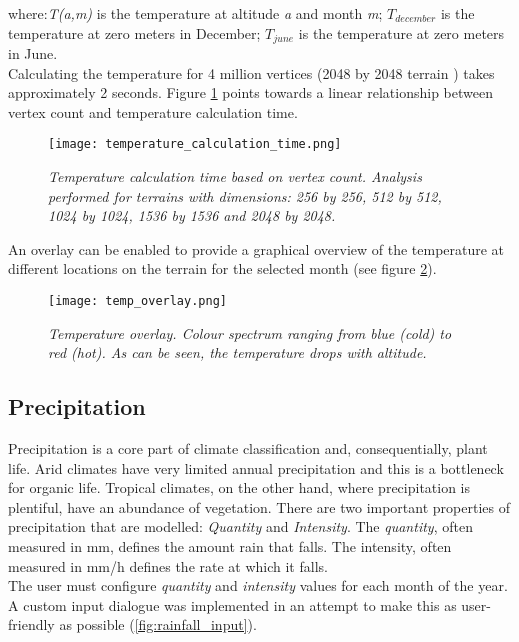 where:\textit{T(a,m)} is the temperature at altitude \textit{a} and month \textit{m}; \textit{$T_{december}$} is the temperature at zero meters in December; \textit{$T_{june}$} is the temperature at zero meters in June.\\

Calculating the temperature for 4 million vertices (2048 by 2048 terrain ) takes approximately 2 seconds. Figure \ref{fig:temperature_calculation_time} points towards a linear relationship between vertex count and temperature calculation time.

\begin{figure}
\center
	\texttt{[image: temperature\_calculation\_time.png]}
	\caption{ \textit{Temperature calculation time based on vertex count. Analysis performed for terrains with dimensions: 256 by 256, 512 by 512, 1024 by 1024, 1536 by 1536 and 2048 by 2048.} }
	\label{fig:temperature_calculation_time}
\end{figure}

An overlay can be enabled to provide a graphical overview of the temperature at different locations on the terrain for the selected month (see figure \ref{fig:temp_overlay}).

\begin{figure}
\center
	\texttt{[image: temp\_overlay.png]}
	\caption{ \textit{Temperature overlay. Colour spectrum ranging from blue (cold) to red (hot). As can be seen, the temperature drops with altitude.}}
	\label{fig:temp_overlay}
\end{figure}

\subsection{Precipitation} \label{sec:precipitation}

Precipitation is a core part of climate classification and, consequentially, plant life. Arid climates have very limited annual precipitation and this is a bottleneck for organic life. Tropical climates, on the other hand, where precipitation is plentiful, have an abundance of vegetation. There are two important properties of precipitation that are modelled: \textit{Quantity} and \textit{Intensity}. The \textit{quantity}, often measured in mm, defines the amount rain that falls. The intensity, often measured in mm/h defines the rate at which it falls.\\

The user must configure \textit{quantity} and \textit{intensity} values for each month of the year. A custom input dialogue was implemented in an attempt to make this as user-friendly as possible (\ref{fig:rainfall_input}).

